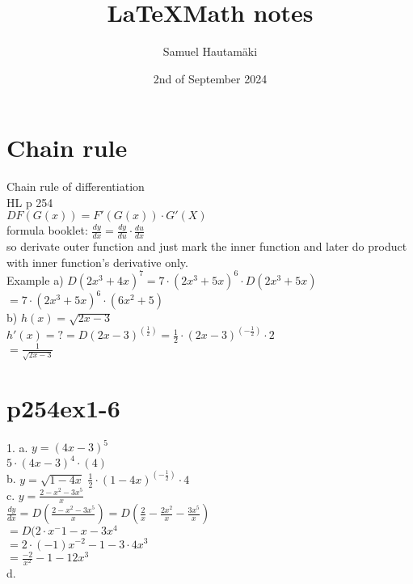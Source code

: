 \documentclass{article}
\title{\LaTeX Math notes}
\author{Samuel Hautamäki}
\date{2nd of September 2024}
\begin{document}
  \maketitle
   
  \section{Chain rule}
  Chain rule of differentiation\\
  HL p 254\\
  $D F ( G(x)) = F'(G(x)) \cdot G'(X)$\\
  formula booklet: $\frac{dy}{dx}=\frac{dy}{du}\cdot\frac{du}{dx}$\\
  so derivate outer function and just mark the inner function and later do product with inner function's derivative only.\\
  
  Example a) $D(2x^3+4x)^7=7\cdot(2x^3+5x)^6\cdot D(2x^3+5x)$\\
  $=7\cdot(2x^3+5x)^6\cdot(6x^2+5)$\\
  b) $h(x)=\sqrt{2x-3}$\\
  $h'(x)=?=D (2x-3)^(\frac{1}{2})=\frac{1}{2}\cdot(2x-3)^(-\frac{1}{2})\cdot2$\\
  $=\frac{1}{\sqrt{2x-3}}$\\
  \section{p254ex1-6}
  1. a. $y=(4x-3)^5$\\
  $5\cdot(4x-3)^4\cdot(4)$\\
  b. $y=\sqrt{1-4x}$
  $\frac{1}{2}\cdot(1-4x)^(-\frac{1}{2})\cdot4$\\
  c. $y=\frac{2-x^2-3x^5}{x}$\\
  $\frac{dy}{dx}=D(\frac{2-x^2-3x^5}{x})=D(\frac{2}{x}-\frac{2x^2}{x}-\frac{3x^5}{x})$\\
  $=D(2\cdot x{^-1}-x-3x^4$\\
  $=2\cdot(-1)x^{-2}-1-3\cdot4x^3$\\
  $=\frac{-2}{x^2}-1-12x^3$\\
  d.  

   
\end{document}
